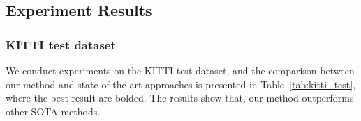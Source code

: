 \documentclass[journal]{IEEEtran}
\begin{document}
\begin{table}[]
	\centering
	\caption{Results of Waymo Validation Dataset}
	\label{tab:waymo_valid}
\end{table}
	\subsection{Experiment Results}
	\subsubsection{KITTI test dataset}
	We conduct experiments on the KITTI test dataset, and the comparison between our method and state-of-the-art approaches is presented in Table~\ref{tab:kitti_test}, where the best result are bolded. The results show that, our method outperforms other SOTA methods.
	
\end{document}
